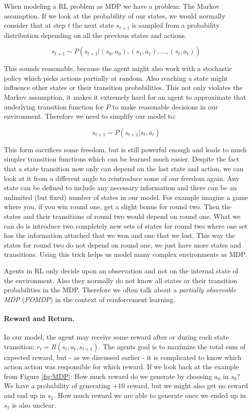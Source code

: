 When modeling a RL problem as MDP we have a problem: The Markov assumption. If we look at the probability of our states, we would normally consider that at step $t$ the next state $s_{t+1}$ is sampled from a probability distribution depending on all the previous states and actions.

\[s_{t+1} \sim P\left(s_{t+1}|(s_0, a_0), (s_1, a_1), \dots, (s_t, a_t)\right)\]

 This sounds reasonable, because the agent might also work with a stochastic policy which picks actions partially at random. Also reaching a state might influence other states or their transition probabilities. This not only violates the Markov assumption, it makes it extremely hard for an agent to approximate that underlying transition function for $P$ to make reasonable decisions in our environment. Therefore we need to simplify our model to:  

 \[s_{t+1} \sim P(s_{t+1}|s_t, a_t)\]

This form sacrifices some freedom, but is still powerful enough and leads to much simpler transition functions which can be learned much easier. Despite the fact that a state transition now only can depend on the last state and action, we can look at it from a different angle to reintroduce some of our freedom again. Any state can be defined to include any necessary information and there can be an unlimited (but fixed) number of states in our model. For example imagine a game where you, if you win round one, get a slight bonus for round two. Then the states and their transitions of round two would depend on round one. What we can do is introduce two completely new sets of states for round two where one set has the information attached that we won and one that we lost. This way the states for round two do not depend on round one, we just have more states and transitions. Using this trick helps us model many complex environments as MDP.

Agents in RL only decide upon an observation and not on the internal state of the environment. Also they normally do not know all states or their transition probabilities in the MDP. Therefore we often talk about a \textit{partially observable MDP} (\textit{POMDP}) in the context of reinforcement learning.

\paragraph{Reward and Return.}
In our model, the agent may receive some reward after or during each state transition: $r_t = R(s_t, a_t, s_{t+1})$. The agents goal is to maximize the total sum of expected reward, but - as we discussed earlier - it is complicated to know which action action was responsible for which reward. If we look back at the example from Figure \ref{fig:MDP}: How much reward do we generate by choosing $a_0$ in $s_0$? We have a probability of generating $+10$ reward, but we might also get no reward and end up in $s_1$. How much reward we are able to generate once we ended up in $s_1$ is also unclear.

